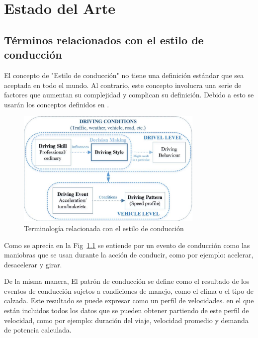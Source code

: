 
\chapter{Estado del Arte}

\ifpdf
    \graphicspath{{Chapter2/Figs/Raster/}{Chapter2/Figs/PDF/}{Chapter2/Figs/}}
\else
    \graphicspath{{Chapter2/Figs/Vector/}{Chapter2/Figs/}}
\fi

\section{Términos relacionados con el estilo de conducción}

El concepto de "Estilo de conducción" no tiene una definición estándar que sea aceptada en todo el mundo. Al contrario, este concepto involucra una serie de factores que aumentan su complejidad y complican su definición. Debido a esto se usarán los conceptos definidos en \cite{8002632}.

\begin{figure}[htbp!]
\centering
\includegraphics[width=0.8\textwidth]{Fig1}
\caption[Terminología estilo de conducción]{Terminología relacionada con el estilo de conducción}
\label{fig:1}
\end{figure}

Como se aprecia en la Fig~\ref{fig:1}  se entiende por un evento de conducción como las maniobras que se usan durante la acción de conducir, como por ejemplo: acelerar, desacelerar y girar.

De la misma manera, El patrón de conducción se define como el resultado de los eventos de conducción sujetos a condiciones de manejo, como el clima o el tipo de calzada. Este resultado se puede expresar como un perfil de velocidades. en el que están incluidos todos los datos que se pueden obtener partiendo de este perfil de velocidad, como por ejemplo: duración del viaje, velocidad promedio y demanda de potencia calculada.

